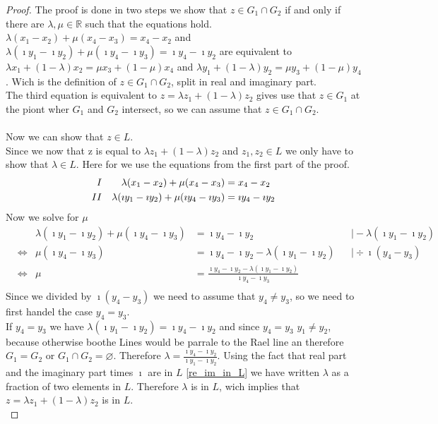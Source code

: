 \begin{proof}
    The proof is done in two steps we show that $z \in G_1 \cap G_2$ if and only if there are $\lambda, \mu \in \mathbb{R}$ such that the equations hold. \\
    $\lambda(x_1 - x_2)+\mu(x_4-x_3) = x_4-x_2$ and $\lambda(\imath y_1 - \imath y_2)+\mu(\imath y_4-\imath y_3) = \imath y_4-\imath y_2$ 
    are equivalent to $\lambda x_1 + (1-\lambda)x_2 = \mu x_3 + (1-\mu)x_4$ and $\lambda y_1 + (1-\lambda)y_2 = \mu y_3 + (1-\mu)y_4$. Wich is the definition of $z \in G_1 \cap G_2$, split in real and imaginary part.\\
    The third equation is equivalent to $z = \lambda z_1 + (1-\lambda)z_2$ gives use that $z \in G_1$ at the piont wher $G_1$ and $G_2$ intersect, so we can assume that $z \in G_1 \cap G_2$.\\ \\
    Now we can show that $z \in L$.\\
    Since we now that z is equal to $\lambda z_1 + (1-\lambda)z_2$ and $z_1, z_2 \in L$ we only have to show that $\lambda \in L$. Here for we use the equations from the first part of the proof.
    \begin{align*}
        \RNum{1} &&\lambda(x_1 - x_2)+\mu(x_4-x_3) &= x_4-x_2\\
        \RNum{2} &&\lambda(\imath y_1 - \imath y_2)+\mu(\imath y_4-\imath y_3) &= \imath y_4-\imath y_2
    \end{align*}
    Now we solve  for $\mu$ 
    \begin{align*}
        && \lambda(\imath y_1 - \imath y_2)+\mu(\imath y_4-\imath y_3) &= \imath y_4-\imath y_2 && \mid -\lambda(\imath y_1 - \imath y_2)\\
        &\Leftrightarrow & \mu(\imath y_4-\imath y_3) &= \imath y_4-\imath y_2 - \lambda(\imath y_1 - \imath y_2) && \mid \div \imath(y_4-y_3)\\
        &\Leftrightarrow & \mu &= \frac{\imath y_4-\imath y_2 - \lambda(\imath y_1 - \imath y_2)}{\imath y_4-\imath y_3}\\
    \end{align*}
    Since we divided by $\imath (y_4-y_3)$ we need to assume that $y_4 \ne y_3$, so we need to first handel the case $y_4 = y_3$.\\
    If $y_4 = y_3$ we have $\lambda(\imath y_1 - \imath y_2) = \imath y_4-\imath y_2$ and since $y_4 = y_3$ $y_1 \ne y_2$, because otherwise boothe Lines would be parrale to the Rael line an therefore $G_1 = G_2$ or $G_1 \cap G_2 = \varnothing$. Therefore $\lambda = \frac{\imath y_4-\imath y_2}{\imath y_1 - \imath y_2}$. Using the fact that real part and the imaginary part times $\imath$ are in $L$ \ref{re_im_in_L} we have written $\lambda$ as a fraction of two elements in $L$. Therefore $\lambda$ is in $L$, wich implies that $z = \lambda z_1 + (1-\lambda)z_2$ is in $L$.\\
   

\end{proof}

